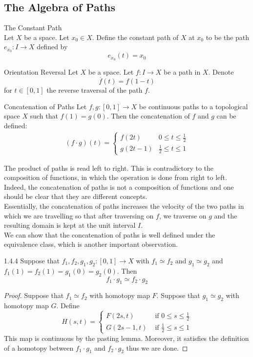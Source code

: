 \documentclass[a4paper]{article}
\begin{document}
\subsection{The Algebra of Paths}
\begin{defn}{The Constant Path}{}\\
Let $X$ be a space. Let $x_0\in X$. Define the constant path of $X$ at $x_0$ to be the path $e_{x_0}:I\to X$ defined by $$e_{x_0}(t)=x_0$$
\end{defn}

\begin{defn}{Orientation Reversal}{} Let $X$ be a space. Let $f:I\to X$ be a path in $X$. Denote $$\overline{f}(t)=f(1-t)$$ for $t\in[0,1]$ the reverse traversal of the path $f$. 
\end{defn}

\begin{defn}{Concatenation of Paths}{} Let $f,g:[0,1]\to X$ be continuous paths to a topological space $X$ such that $f(1)=g(0)$. Then the concatenation of $f$ and $g$ can be defined:
\begin{align*}
(f\cdot g)(t)=\begin{cases}
f(2t) & 0\leq t\leq\frac{1}{2}\\
g(2t-1) & \frac{1}{2}\leq t\leq 1
\end{cases}
\end{align*}
\end{defn}

The product of paths is read left to right. This is contradictory to the composition of functions, in which the operation is done from right to left. Indeed, the concatenation of paths is not a composition of functions and one should be clear that they are different concepts. \\

Essentially, the concatenation of paths increases the velocity of the two paths in which we are travelling so that after traversing on $f$, we traverse on $g$ and the resulting domain is kept at the unit interval $I$. \\

We can show that the concatenation of paths is well defined under the equivalence class, which is another important observation. 

\begin{lmm}{}{1.4.4} Suppose that $f_1,f_2,g_1,g_2:[0,1]\to X$ with $f_1\simeq f_2$ and $g_1\simeq g_2$ and $f_1(1)=f_2(1)=g_1(0)=g_2(0)$. Then $$f_1\cdot g_1\simeq f_2\cdot g_2$$ 
\begin{proof}
Suppose that $f_1\simeq f_2$ with homotopy map $F$. Suppose that $g_1\simeq g_2$ with homotopy map $G$. Define $$H(s,t)=\begin{cases}
F(2s,t) & \text{ if } 0\leq s\leq\frac{1}{2}\\
G(2s-1,t) & \text{ if } \frac{1}{2}\leq s\leq 1
\end{cases}$$
This map is continuous by the pasting lemma. Moreover, it satisfies the definition of a homotopy between $f_1\cdot g_1$ and $f_2\cdot g_2$ thus we are done. 
\end{proof}
\end{lmm}
\end{document}
